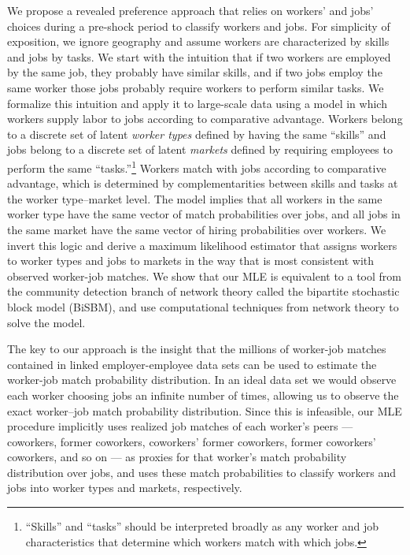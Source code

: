 \documentclass[12pt]{article}
\theoremstyle{definition}
\theoremstyle{plain}
\begin{document}
We propose a revealed preference approach that relies on workers' and jobs' choices during a pre-shock period to classify workers and jobs. For simplicity of exposition, we ignore geography and assume workers are characterized by skills and jobs by tasks. We start with the intuition that if two workers are employed by the same job, they probably have similar skills, and if two jobs employ the same worker those jobs probably require workers to perform similar tasks. We formalize this intuition and apply it to large-scale data using a \citet{Roy1951} model in which workers supply labor to jobs according to comparative advantage. Workers belong to a discrete set of latent \emph{worker types} defined by having the same ``skills'' and jobs belong to a discrete set of latent \emph{markets} defined by requiring employees to perform the same ``tasks.''\footnote{``Skills'' and ``tasks'' should be interpreted broadly as any worker and job characteristics that determine which workers match with which jobs.}  Workers match with jobs according to comparative advantage, which is determined by complementarities between skills and tasks at the worker type--market level. The model implies that all workers in the same worker type have the same vector of match probabilities over jobs, and all jobs in the same market  have the same vector of hiring probabilities over workers. We invert this logic and derive a maximum likelihood estimator that assigns workers to worker types and jobs to markets in the way that is most consistent with observed worker-job matches. We show that our MLE is equivalent to a tool from the community detection branch of network theory called the bipartite stochastic block model (BiSBM), and use computational techniques from network theory to solve the model. 

The key to our approach is the insight that the millions of worker-job matches contained in linked employer-employee data sets can be used to estimate the worker-job match probability distribution. In an ideal data set we would observe each worker choosing jobs an infinite number of times, allowing us to observe the exact worker--job match probability distribution. Since this is infeasible, our MLE procedure implicitly uses realized job matches of each worker's peers --- coworkers, former coworkers, coworkers' former coworkers, former coworkers' coworkers, and so on --- as proxies for that worker's match probability distribution over jobs, and uses these match probabilities to classify workers and jobs into worker types and markets, respectively.
\end{document}
